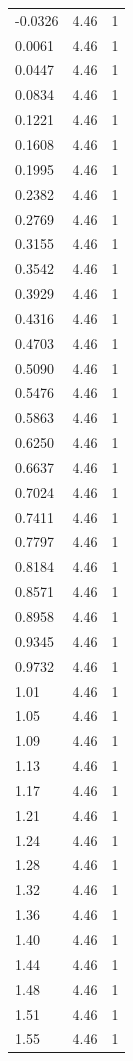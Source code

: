 \begin{longtable}{lrr}
  -0.0326 & 4.46 & 1 \\
  0.0061 & 4.46 & 1 \\
  0.0447 & 4.46 & 1 \\
  0.0834 & 4.46 & 1 \\
  0.1221 & 4.46 & 1 \\
  0.1608 & 4.46 & 1 \\
  0.1995 & 4.46 & 1 \\
  0.2382 & 4.46 & 1 \\
  0.2769 & 4.46 & 1 \\
  0.3155 & 4.46 & 1 \\
  0.3542 & 4.46 & 1 \\
  0.3929 & 4.46 & 1 \\
  0.4316 & 4.46 & 1 \\
  0.4703 & 4.46 & 1 \\
  0.5090 & 4.46 & 1 \\
  0.5476 & 4.46 & 1 \\
  0.5863 & 4.46 & 1 \\
  0.6250 & 4.46 & 1 \\
  0.6637 & 4.46 & 1 \\
  0.7024 & 4.46 & 1 \\
  0.7411 & 4.46 & 1 \\
  0.7797 & 4.46 & 1 \\
  0.8184 & 4.46 & 1 \\
  0.8571 & 4.46 & 1 \\
  0.8958 & 4.46 & 1 \\
  0.9345 & 4.46 & 1 \\
  0.9732 & 4.46 & 1 \\
  1.01 & 4.46 & 1 \\
  1.05 & 4.46 & 1 \\
  1.09 & 4.46 & 1 \\
  1.13 & 4.46 & 1 \\
  1.17 & 4.46 & 1 \\
  1.21 & 4.46 & 1 \\
  1.24 & 4.46 & 1 \\
  1.28 & 4.46 & 1 \\
  1.32 & 4.46 & 1 \\
  1.36 & 4.46 & 1 \\
  1.40 & 4.46 & 1 \\
  1.44 & 4.46 & 1 \\
  1.48 & 4.46 & 1 \\
  1.51 & 4.46 & 1 \\
  1.55 & 4.46 & 1 \\

\end{longtable}
